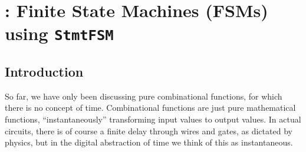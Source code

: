 

\chapter{{\BSV}: Finite State Machines (FSMs) using {\tt StmtFSM}}


\setcounter{page}{1}
\renewcommand{\thepage}{\arabic{chapter}-\arabic{page}}

\label{ch_FSMs}


\section{Introduction}


So far, we have only been discussing pure combinational functions, for
which there is no concept of time.  Combinational functions are just
pure mathematical functions, ``instantaneously'' transforming input
values to output values.  In actual circuits, there is of course a
finite delay through wires and gates, as dictated by physics, but in
the digital abstraction of time we think of this as instantaneous.

